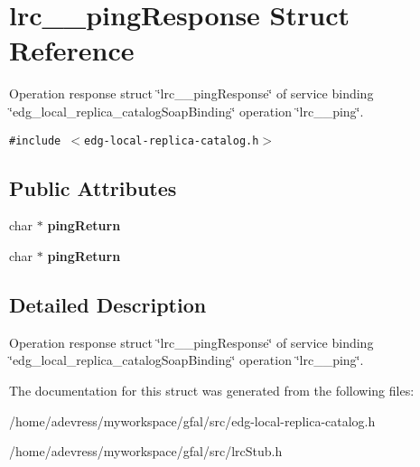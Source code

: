 \section{lrc\_\-\_\-ping\-Response Struct Reference}
\label{structlrc____pingResponse}
Operation response struct \char`\"{}lrc\_\-\_\-ping\-Response\char`\"{} of service binding \char`\"{}edg\_\-local\_\-replica\_\-catalog\-Soap\-Binding\char`\"{} operation \char`\"{}lrc\_\-\_\-ping\char`\"{}.  


{\tt \#include $<$edg-local-replica-catalog.h$>$}

\subsection*{Public Attributes}
\begin{CompactItemize}
\item 
char $\ast$ \textbf{ping\-Return}\label{structlrc____pingResponse_7d280b276562c4041a1accbef019f4cf}

\item 
char $\ast$ \textbf{ping\-Return}\label{structlrc____pingResponse_7d280b276562c4041a1accbef019f4cf}

\end{CompactItemize}


\subsection{Detailed Description}
Operation response struct \char`\"{}lrc\_\-\_\-ping\-Response\char`\"{} of service binding \char`\"{}edg\_\-local\_\-replica\_\-catalog\-Soap\-Binding\char`\"{} operation \char`\"{}lrc\_\-\_\-ping\char`\"{}. 



The documentation for this struct was generated from the following files:\begin{CompactItemize}
\item 
/home/adevress/myworkspace/gfal/src/edg-local-replica-catalog.h\item 
/home/adevress/myworkspace/gfal/src/lrc\-Stub.h\end{CompactItemize}
